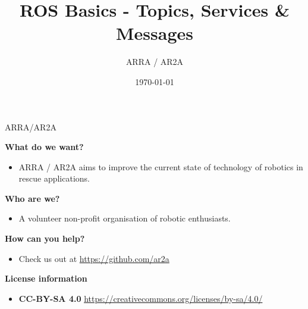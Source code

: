 \documentclass{beamer}
\title[]{ROS Basics - Topics, Services \& Messages} %
\author{ARRA / AR2A} %
\institute %
{
Advancements for Robotics in Rescue Applications
}
\date{\today} %
\begin{document}
\begin{frame}
\titlepage %
\end{frame}
\begin{frame}
	\tableofcontents
\end{frame}
\begin{frame}{ARRA/AR2A}
\begin{large}\textbf{What do we want?}\end{large}
\begin{itemize}
 \item ARRA / AR2A aims to improve the current state of technology of robotics in rescue applications.
\end{itemize}
\begin{large}\textbf{Who are we?}\end{large}
\begin{itemize}
 \item A volunteer non-profit organisation of robotic enthusiasts.
\end{itemize}
\begin{large}\textbf{How can you help?}\end{large}
\begin{itemize}
 \item Check us out at \url{https://github.com/ar2a}
\end{itemize}
 \vspace{1cm}
\begin{large}\textbf{License information}\end{large}
\begin{itemize}
 \item \textbf{CC-BY-SA 4.0} \url{https://creativecommons.org/licenses/by-sa/4.0/}
\end{itemize}
\end{frame}
\end{document}
